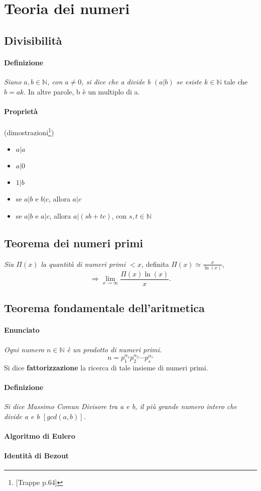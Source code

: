 \documentclass[12pt]{article}
\begin{document}
\section{Teoria dei numeri}
\subsection{Divisibilità}
\paragraph{Definizione}
\textit{Siano $a,b\in \mathbb{N}$, con $a\neq 0$, si dice che a divide b $(a|b)$ se esiste $k\in \mathbb{N}$} tale che $b=ak$. In altre parole, b è un multiplo di a.
\paragraph{Proprietà} (dimostrazioni\footnote{[Trappe p.64]})
\begin{itemize}
\item $a|a$
\item $a|0$
\item $1|b$
\item se $a|b$ e $b|c$, allora $a|c$
\item se $a|b$ e $a|c$, allora $a|(sb + tc)$, con $s,t\in \mathbb{N}$
\end{itemize}
\subsection{Teorema dei numeri primi}
\textit{Sia $\Pi (x)$ la quantità di numeri primi $<x$,} definita $\Pi (x) \simeq \frac{x}{\ln{(x)}}$,
$$\Rightarrow \lim_{x\to\infty} \frac{\Pi (x)\ln{(x)}}{x}.$$
\subsection{Teorema fondamentale dell'aritmetica}
\paragraph{Enunciato} \textit{Ogni numero $n\in \mathbb{N}$ è un prodotto di numeri primi.}
$$n=p_1^{\alpha _1}p_2^{\alpha _2}\cdots p_s^{\alpha _s}$$
Si dice \textbf{fattorizzazione} la ricerca di tale insieme di numeri primi.
\paragraph{Definizione} \textit{Si dice Massimo Comun Divisore tra a e b, il più grande numero intero che divide a e b $[gcd(a,b)]$.}
\paragraph{Algoritmo di Eulero}
\paragraph{Identità di Bezout}
\end{document}
